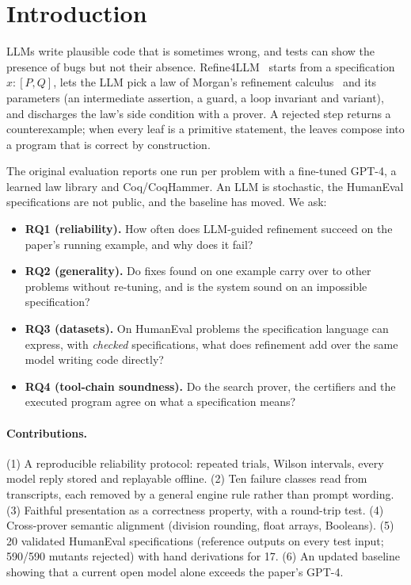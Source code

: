 \documentclass[10pt]{article}
\begin{document}
\section{Introduction}
LLMs write plausible code that is sometimes wrong, and tests can show the presence of bugs but not their absence. Refine4LLM~\cite{refine4llm} starts from a specification $x:[P,Q]$, lets the LLM pick a law of Morgan's refinement calculus~\cite{morgan} and its parameters (an intermediate assertion, a guard, a loop invariant and variant), and discharges the law's side condition with a prover. A rejected step returns a counterexample; when every leaf is a primitive statement, the leaves compose into a program that is correct by construction.

The original evaluation reports one run per problem with a fine-tuned GPT-4, a learned law library and Coq/CoqHammer. An LLM is stochastic, the HumanEval specifications are not public, and the baseline has moved. We ask:
\begin{itemize}
\item \textbf{RQ1 (reliability).} How often does LLM-guided refinement succeed on the paper's running example, and why does it fail?
\item \textbf{RQ2 (generality).} Do fixes found on one example carry over to other problems without re-tuning, and is the system sound on an impossible specification?
\item \textbf{RQ3 (datasets).} On HumanEval problems the specification language can express, with \emph{checked} specifications, what does refinement add over the same model writing code directly?
\item \textbf{RQ4 (tool-chain soundness).} Do the search prover, the certifiers and the executed program agree on what a specification means?
\end{itemize}

\paragraph{Contributions.}
(1) A reproducible reliability protocol: repeated trials, Wilson intervals, every model reply stored and replayable offline. (2) Ten failure classes read from transcripts, each removed by a general engine rule rather than prompt wording. (3) Faithful presentation as a correctness property, with a round-trip test. (4) Cross-prover semantic alignment (division rounding, float arrays, Booleans). (5) 20 validated HumanEval specifications (reference outputs on every test input; 590/590 mutants rejected) with hand derivations for 17. (6) An updated baseline showing that a current open model alone exceeds the paper's GPT-4.
\end{document}
